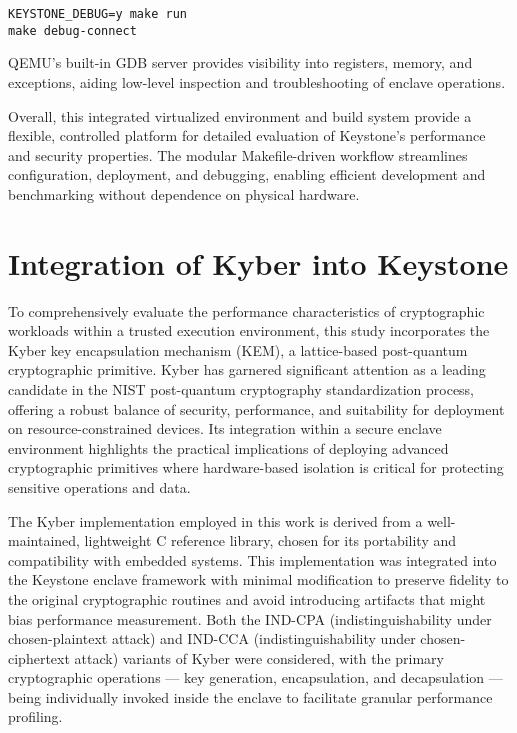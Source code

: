 \begin{lstlisting}
KEYSTONE_DEBUG=y make run
make debug-connect
\end{lstlisting}

QEMU’s built-in GDB server provides visibility into registers, memory, and exceptions, aiding low-level inspection and troubleshooting of enclave operations.



Overall, this integrated virtualized environment and build system provide a flexible, controlled platform for detailed evaluation of Keystone’s performance and security properties. The modular Makefile-driven workflow streamlines configuration, deployment, and debugging, enabling efficient development and benchmarking without dependence on physical hardware. %

\section{Integration of Kyber into Keystone}
\label{sec:kyber-enclave}

To comprehensively evaluate the performance characteristics of cryptographic workloads within a trusted execution environment, this study incorporates the Kyber key encapsulation mechanism (KEM), a lattice-based post-quantum cryptographic primitive. Kyber has garnered significant attention as a leading candidate in the NIST post-quantum cryptography standardization process, offering a robust balance of security, performance, and suitability for deployment on resource-constrained devices. Its integration within a secure enclave environment highlights the practical implications of deploying advanced cryptographic primitives where hardware-based isolation is critical for protecting sensitive operations and data.

The Kyber implementation employed in this work is derived from a well-maintained, lightweight C reference library, chosen for its portability and compatibility with embedded systems. This implementation was integrated into the Keystone enclave framework with minimal modification to preserve fidelity to the original cryptographic routines and avoid introducing artifacts that might bias performance measurement. Both the IND-CPA (indistinguishability under chosen-plaintext attack) and IND-CCA (indistinguishability under chosen-ciphertext attack) variants of Kyber were considered, with the primary cryptographic operations — key generation, encapsulation, and decapsulation — being individually invoked inside the enclave to facilitate granular performance profiling.

